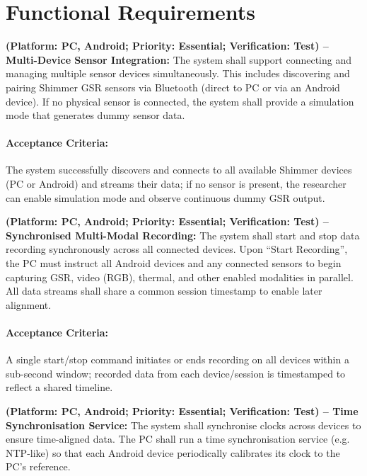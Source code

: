 \section{Functional Requirements}

\begin{description}[style=unboxed,leftmargin=0cm]
    \item[\textbf{FR1}] \textbf{(Platform: PC, Android; Priority: Essential; Verification: Test) – Multi-Device Sensor Integration:} The system shall support connecting and managing multiple sensor devices simultaneously. This includes discovering and pairing Shimmer GSR sensors via Bluetooth (direct to PC or via an Android device). If no physical sensor is connected, the system shall provide a simulation mode that generates dummy sensor data.

    \paragraph{Acceptance Criteria:} The system successfully discovers and connects to all available Shimmer devices (PC or Android) and streams their data; if no sensor is present, the researcher can enable simulation mode and observe continuous dummy GSR output.

    \item[\textbf{FR2}] \textbf{(Platform: PC, Android; Priority: Essential; Verification: Test) – Synchronised Multi-Modal Recording:} The system shall start and stop data recording synchronously across all connected devices. Upon “Start Recording”, the PC must instruct all Android devices and any connected sensors to begin capturing GSR, video (RGB), thermal, and other enabled modalities in parallel. All data streams shall share a common session timestamp to enable later alignment.

    \paragraph{Acceptance Criteria:} A single start/stop command initiates or ends recording on all devices within a sub-second window; recorded data from each device/session is timestamped to reflect a shared timeline.

    \item[\textbf{FR3}] \textbf{(Platform: PC, Android; Priority: Essential; Verification: Test) – Time Synchronisation Service:} The system shall synchronise clocks across devices to ensure time-aligned data. The PC shall run a time synchronisation service (e.g. NTP-like) so that each Android device periodically calibrates its clock to the PC’s reference.


\end{description}
